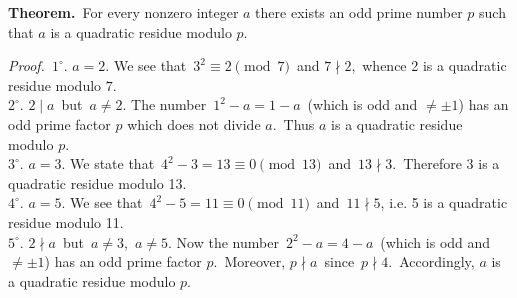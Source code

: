 \documentclass[12pt]{article}
\theoremstyle{definition}
\begin{document}
\textbf{Theorem.}\, For every nonzero integer $a$ there exists an odd prime number $p$ such that $a$ is a quadratic residue modulo $p$.


{\em Proof.}\, $1^\circ.$\; $a = 2$.\; We see that\, $3^2 \equiv 2 \pmod7$\, and $7 \nmid 2$,\, whence 2 is a quadratic residue modulo $7$.\\
$2^\circ.$\; $2 \mid a$\, but\, $a \neq 2$.\; The number\, $1^2-a = 1-a$\, (which is odd and $\neq \pm1$) has an odd prime factor $p$ which does not divide $a$.\, Thus $a$ is a quadratic residue modulo $p$.\\
$3^\circ.$\; $a = 3$.\; We state that\, $4^2-3 = 13 \equiv 0 \pmod{13}$\, and\, $13 \nmid 3$.\, Therefore 3 is a quadratic residue modulo 13.\\
$4^\circ.$\; $a = 5$.\; We see that\, $4^2-5 = 11 \equiv 0 \pmod{11}$\, and\, $11 \nmid 5$, i.e. 5 is a quadratic residue modulo 11.\\
$5^\circ.$\; $2 \nmid a$\, but\, $a \neq 3$,\, $a \neq 5$.\; Now the number\, $2^2-a = 4-a$\, (which is odd and $\neq \pm1$) has an odd prime factor $p$.\, Moreover, $p \nmid a$\, since\, $p \nmid 4$.\, Accordingly, $a$ is a quadratic residue modulo $p$.

\end{document}
